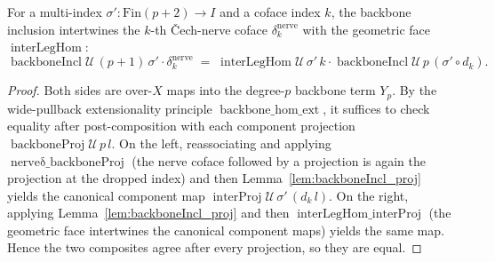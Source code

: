 \begin{lemma}
  \label{lem:backboneIncl_nerveδ}
  For a multi-index \(\sigma' : \mathrm{Fin}(p+2) \to I\) and a coface index \(k\), the backbone
  inclusion intertwines the \(k\)-th {\v C}ech-nerve coface \(\delta^{\mathrm{nerve}}_k\) with the
  geometric face \(\operatorname{interLegHom}\):
  \[
    \operatorname{backboneIncl}\mathcal{U}\,(p+1)\,\sigma'\cdot \delta^{\mathrm{nerve}}_k
      \;=\;
    \operatorname{interLegHom}\mathcal{U}\,\sigma'\,k\cdot
      \operatorname{backboneIncl}\mathcal{U}\,p\,(\sigma' \circ d_k).
  \]
\end{lemma}
\begin{proof}
  Both sides are over-\(X\) maps into the degree-\(p\) backbone term \(Y_p\). By the wide-pullback
  extensionality principle \(\operatorname{backbone\_hom\_ext}\), it suffices to check equality after
  post-composition with each component projection \(\operatorname{backboneProj}\mathcal{U}\,p\,l\).
  On the left, reassociating and applying \(\operatorname{nerveδ\_backboneProj}\) (the nerve coface
  followed by a projection is again the projection at the dropped index) and then
  Lemma~\ref{lem:backboneIncl_proj} yields the canonical component map
  \(\operatorname{interProj}\mathcal{U}\,\sigma'\,(d_k\,l)\). On the right, applying
  Lemma~\ref{lem:backboneIncl_proj} and then \(\operatorname{interLegHom\_interProj}\) (the geometric
  face intertwines the canonical component maps) yields the same map. Hence the two composites agree
  after every projection, so they are equal.
\end{proof}

